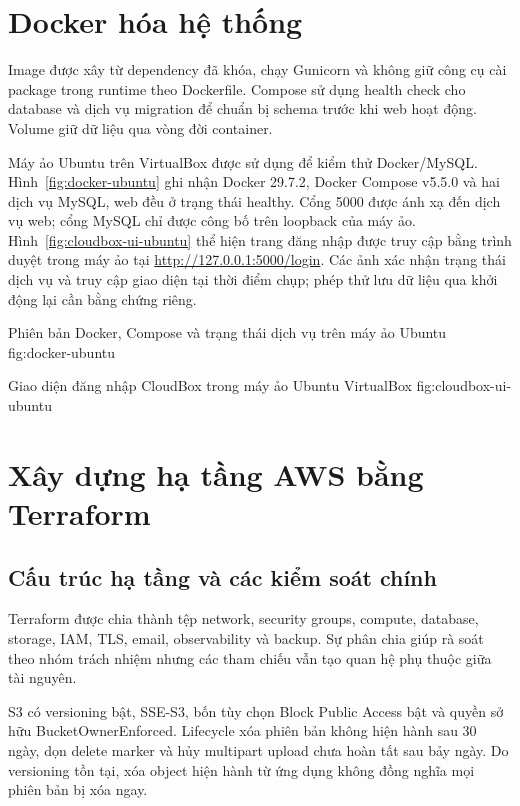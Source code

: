 \section{Docker hóa hệ thống}
Image được xây từ dependency đã khóa, chạy Gunicorn và không giữ công cụ cài package trong runtime theo Dockerfile. Compose sử dụng health check cho database và dịch vụ migration để chuẩn bị schema trước khi web hoạt động. Volume giữ dữ liệu qua vòng đời container.

Máy ảo Ubuntu trên VirtualBox được sử dụng để kiểm thử Docker/MySQL. Hình~\ref{fig:docker-ubuntu} ghi nhận Docker 29.7.2, Docker Compose v5.5.0 và hai dịch vụ MySQL, web đều ở trạng thái healthy. Cổng 5000 được ánh xạ đến dịch vụ web; cổng MySQL chỉ được công bố trên loopback của máy ảo. Hình~\ref{fig:cloudbox-ui-ubuntu} thể hiện trang đăng nhập được truy cập bằng trình duyệt trong máy ảo tại \url{http://127.0.0.1:5000/login}. Các ảnh xác nhận trạng thái dịch vụ và truy cập giao diện tại thời điểm chụp; phép thử lưu dữ liệu qua khởi động lại cần bằng chứng riêng.

{Phiên bản Docker, Compose và trạng thái dịch vụ trên máy ảo Ubuntu}
{fig:docker-ubuntu}

{Giao diện đăng nhập CloudBox trong máy ảo Ubuntu VirtualBox}
{fig:cloudbox-ui-ubuntu}

\section{Xây dựng hạ tầng AWS bằng Terraform}
\subsection{Cấu trúc hạ tầng và các kiểm soát chính}
Terraform được chia thành tệp network, security groups, compute, database, storage, IAM, TLS, email, observability và backup. Sự phân chia giúp rà soát theo nhóm trách nhiệm nhưng các tham chiếu vẫn tạo quan hệ phụ thuộc giữa tài nguyên.

S3 có versioning bật, SSE-S3, bốn tùy chọn Block Public Access bật và quyền sở hữu BucketOwnerEnforced. Lifecycle xóa phiên bản không hiện hành sau 30 ngày, dọn delete marker và hủy multipart upload chưa hoàn tất sau bảy ngày. Do versioning tồn tại, xóa object hiện hành từ ứng dụng không đồng nghĩa mọi phiên bản bị xóa ngay.

